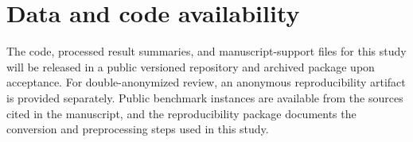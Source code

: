 \section*{Data and code availability}
The code, processed result summaries, and manuscript-support files for this study will be released in a public versioned repository and archived package upon acceptance. For double-anonymized review, an anonymous reproducibility artifact is provided separately. Public benchmark instances are available from the sources cited in the manuscript, and the reproducibility package documents the conversion and preprocessing steps used in this study.
